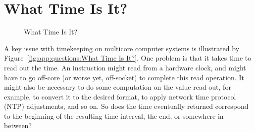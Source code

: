 
\section{What Time Is It?}
\label{sec:app:questions:What Time Is It?}

\begin{figure}[htb]
\centering
{}
\caption{What Time Is It?}
\end{figure}

A key issue with timekeeping on multicore computer systems is illustrated
by Figure~\ref{fig:app:questions:What Time Is It?}.
One problem is that it takes time to read out the time.
An instruction might read from a hardware clock, and might
have to go off-core (or worse yet, off-socket) to complete
this read operation.
It might also be necessary to do some computation on the value read out,
for example, to convert it to the desired format, to apply network time
protocol (NTP) adjustments, and so on.
So does the time eventually returned correspond to the beginning of
the resulting time interval, the end, or somewhere in between?

